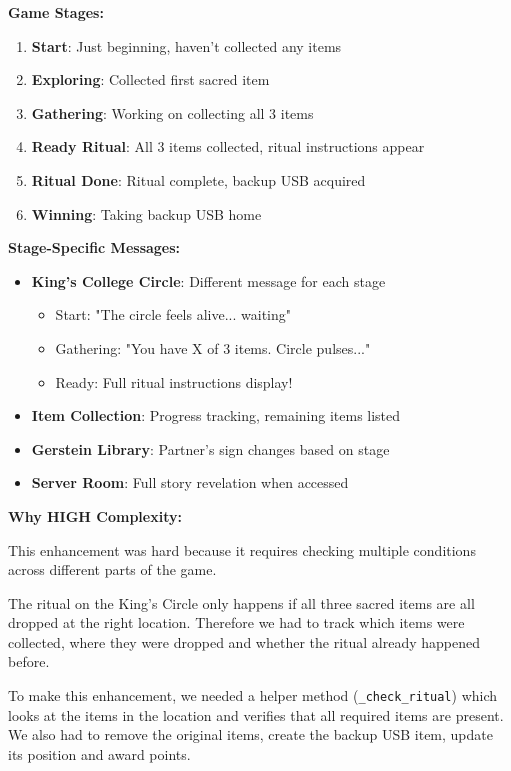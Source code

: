 \documentclass[12pt]{article}
\begin{document}
\textbf{Game Stages:}
\begin{enumerate}
\item \textbf{Start}: Just beginning, haven't collected any items
\item \textbf{Exploring}: Collected first sacred item
\item \textbf{Gathering}: Working on collecting all 3 items
\item \textbf{Ready Ritual}: All 3 items collected, ritual instructions appear
\item \textbf{Ritual Done}: Ritual complete, backup USB acquired
\item \textbf{Winning}: Taking backup USB home
\end{enumerate}

\textbf{Stage-Specific Messages:}
\begin{itemize}
\item \textbf{King's College Circle}: Different message for each stage
  \begin{itemize}
  \item Start: "The circle feels alive... waiting"
  \item Gathering: "You have X of 3 items. Circle pulses..."
  \item Ready: Full ritual instructions display!
  \end{itemize}
\item \textbf{Item Collection}: Progress tracking, remaining items listed
\item \textbf{Gerstein Library}: Partner's sign changes based on stage
\item \textbf{Server Room}: Full story revelation when accessed
\end{itemize}

\textbf{Why HIGH Complexity:}

This enhancement was hard because it requires checking multiple 
conditions across different parts of the game.

The ritual on the King's Circle only happens if all three sacred
items are all dropped at the right location. Therefore we had to
track which items were collected, where they were dropped and whether
the ritual already happened before.

To make this enhancement, we needed a helper method (\texttt{\_check\_ritual})
which looks at the items in the location and verifies that all required items are present. We also had to remove the original items,
create the backup USB item, update its position and award points.
\end{document}
